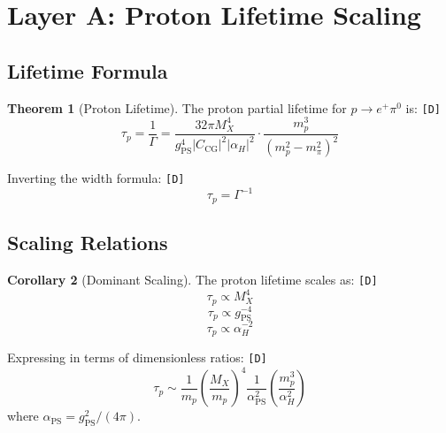 \documentclass[11pt,a4paper]{article}
\newcommand{\tagD}{\textcolor{green!50!black}{\texttt{[D]}}}
\theoremstyle{definition}
\newtheorem{theorem}{Theorem}[section]
\newtheorem{corollary}[theorem]{Corollary}
\begin{document}
\section{Layer A: Proton Lifetime Scaling}
\label{sec:lifetime}

\subsection{Lifetime Formula}
\label{subsec:lifetime-formula}

\begin{theorem}[Proton Lifetime]
\label{thm:lifetime}
The proton partial lifetime for $p \to e^+ \pi^0$ is: \tagD{}
\begin{equation}
\label{eq:lifetime}
\boxed{\tau_p = \frac{1}{\Gamma} = \frac{32\pi M_X^4}{g_{\text{PS}}^4 |C_{\text{CG}}|^2 |\alpha_H|^2}
\cdot \frac{m_p^3}{(m_p^2 - m_\pi^2)^2}}
\end{equation}
\end{theorem}

Inverting the width formula: \tagD{}
\begin{equation}
\label{eq:lifetime-inverse}
\tau_p = \Gamma^{-1}
\end{equation}

\subsection{Scaling Relations}
\label{subsec:scaling}

\begin{corollary}[Dominant Scaling]
\label{cor:scaling}
The proton lifetime scales as: \tagD{}
\begin{equation}
\label{eq:scaling-mx}
\tau_p \propto M_X^4
\end{equation}
\begin{equation}
\label{eq:scaling-g}
\tau_p \propto g_{\text{PS}}^{-4}
\end{equation}
\begin{equation}
\label{eq:scaling-alpha}
\tau_p \propto \alpha_H^{-2}
\end{equation}
\end{corollary}

\begin{derivbox}
Expressing in terms of dimensionless ratios: \tagD{}
\begin{equation}
\label{eq:dimensionless-scaling}
\tau_p \sim \frac{1}{m_p} \left(\frac{M_X}{m_p}\right)^4
\frac{1}{\alpha_{\text{PS}}^2} \left(\frac{m_p^3}{\alpha_H^2}\right)
\end{equation}
where $\alpha_{\text{PS}} = g_{\text{PS}}^2 / (4\pi)$.
\end{derivbox}
\end{document}
